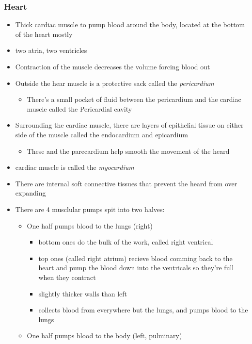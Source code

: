 \documentclass{article}
\theoremstyle{definition}
\begin{document}
\subsubsection{Heart}
\begin{itemize}
	\item Thick cardiac muscle to pump blood around the body, located at the bottom of the heart mostly
	\item two atria, two ventricles
	\item Contraction of the muscle decreases the volume forcing blood out
	\item Outside the hear muscle is a protective sack called the \textit{pericardium} 
		\begin{itemize}
			\item There's a small pocket of fluid between the pericardium and the cardiac muscle called the Pericardial cavity
		\end{itemize}
	\item Surrounding the cardiac muscle, there are layers of epithelial tissue on either side of the muscle called the endocardium and epicardium
		\begin{itemize}
			\item These and the parecardium help smooth the movement of the heard
		\end{itemize}
	\item cardiac muscle is called the \textit{myocardium} 
	\item There are internal soft connective tissues that prevent the heard from over expanding
	\item There are 4 musclular pumps spit into two halves:
		\begin{itemize}
			\item One half pumps blood to the lungs (right)
				\begin{itemize}
					\item bottom ones do the bulk of the work, called right ventrical
					\item top ones (called right atrium) recieve blood comming back to the heart and pump the blood down into the ventricals so they're full when they contract 
					\item slightly thicker walls than left
					\item collects blood from everywhere but the lungs, and pumps blood to the lungs
				\end{itemize}
			\item One half pumps blood to the body (left, pulminary) 
				\begin{itemize}

\end{itemize}
\end{itemize}
\end{itemize}
\end{document}
